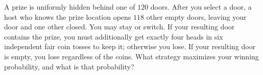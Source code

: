 A prize is uniformly hidden behind one of $120$ doors. After you select a door, a host who knows the prize location opens $118$ other empty doors, leaving your door and one other closed. You may stay or switch. If your resulting door contains the prize, you must additionally get exactly four heads in six independent fair coin tosses to keep it; otherwise you lose. If your resulting door is empty, you lose regardless of the coins. What strategy maximizes your winning probability, and what is that probability?
